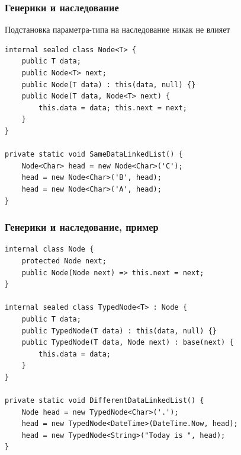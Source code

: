 \documentclass[xetex,mathserif,serif]{beamer}
\begin{document}
	\begin{frame}[fragile]
		\frametitle{Генерики и наследование}
		Подстановка параметра-типа на наследование никак не влияет
		\begin{footnotesize}
			\begin{verbatim}
internal sealed class Node<T> {
    public T data;
    public Node<T> next;
    public Node(T data) : this(data, null) {}
    public Node(T data, Node<T> next) {
        this.data = data; this.next = next;
    }
}

private static void SameDataLinkedList() {
    Node<Char> head = new Node<Char>('C');
    head = new Node<Char>('B', head);
    head = new Node<Char>('A', head);
}
			\end{verbatim}
		\end{footnotesize}
	\end{frame}

	\begin{frame}[fragile]
		\frametitle{Генерики и наследование, пример}
		\begin{footnotesize}
			\begin{verbatim}
internal class Node {
    protected Node next;
    public Node(Node next) => this.next = next;
}

internal sealed class TypedNode<T> : Node {
    public T data;
    public TypedNode(T data) : this(data, null) {}
    public TypedNode(T data, Node next) : base(next) {
        this.data = data;
    }
}

private static void DifferentDataLinkedList() {
    Node head = new TypedNode<Char>('.');
    head = new TypedNode<DateTime>(DateTime.Now, head);
    head = new TypedNode<String>("Today is ", head);
}
			\end{verbatim}
		\end{footnotesize}
	\end{frame}
\end{document}
